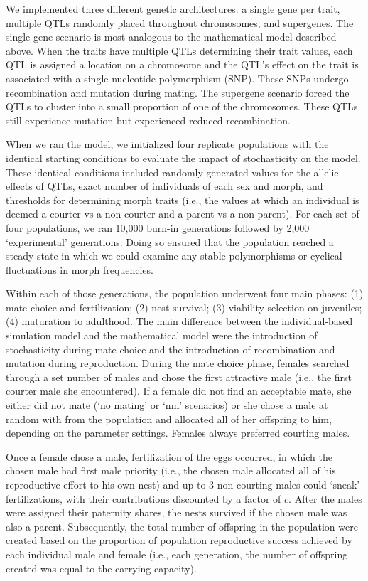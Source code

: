 \documentclass[
  11pt,
]{article}
\begin{document}
We implemented three different genetic architectures: a single gene per
trait, multiple QTLs randomly placed throughout chromosomes, and
supergenes. The single gene scenario is most analogous to the
mathematical model described above. When the traits have multiple QTLs
determining their trait values, each QTL is assigned a location on a
chromosome and the QTL's effect on the trait is associated with a single
nucleotide polymorphism (SNP). These SNPs undergo recombination and
mutation during mating. The supergene scenario forced the QTLs to
cluster into a small proportion of one of the chromosomes. These QTLs
still experience mutation but experienced reduced recombination.

When we ran the model, we initialized four replicate populations with
the identical starting conditions to evaluate the impact of
stochasticity on the model. These identical conditions included
randomly-generated values for the allelic effects of QTLs, exact number
of individuals of each sex and morph, and thresholds for determining
morph traits (i.e., the values at which an individual is deemed a
courter vs a non-courter and a parent vs a non-parent). For each set of
four populations, we ran 10,000 burn-in generations followed by 2,000
`experimental' generations. Doing so ensured that the population reached
a steady state in which we could examine any stable polymorphisms or
cyclical fluctuations in morph frequencies.

Within each of those generations, the population underwent four main
phases: (1) mate choice and fertilization; (2) nest survival; (3)
viability selection on juveniles; (4) maturation to adulthood. The main
difference between the individual-based simulation model and the
mathematical model were the introduction of stochasticity during mate
choice and the introduction of recombination and mutation during
reproduction. During the mate choice phase, females searched through a
set number of males and chose the first attractive male (i.e., the first
courter male she encountered). If a female did not find an acceptable
mate, she either did not mate (`no mating' or `nm' scenarios) or she
chose a male at random with from the population and allocated all of her
offspring to him, depending on the parameter settings. Females always
preferred courting males.

Once a female chose a male, fertilization of the eggs occurred, in which
the chosen male had first male priority (i.e., the chosen male allocated
all of his reproductive effort to his own nest) and up to 3 non-courting
males could `sneak' fertilizations, with their contributions discounted
by a factor of \(c\). After the males were assigned their paternity
shares, the nests survived if the chosen male was also a parent.
Subsequently, the total number of offspring in the population were
created based on the proportion of population reproductive success
achieved by each individual male and female (i.e., each generation, the
number of offspring created was equal to the carrying capacity).
\end{document}
